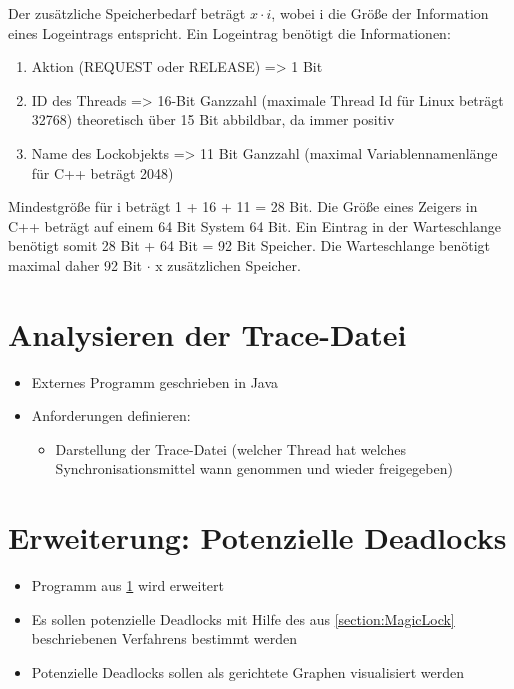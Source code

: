 \begin{itemize}
    Der zusätzliche Speicherbedarf beträgt $x \cdot i$, wobei i die Größe der
    Information eines Logeintrags entspricht. Ein Logeintrag benötigt die
    Informationen:
    \begin{enumerate}
      \item Aktion (REQUEST oder RELEASE) => 1 Bit
      \item ID des Threads => 16-Bit Ganzzahl (maximale Thread Id für Linux
      beträgt 32768) theoretisch über 15 Bit abbildbar, da immer positiv
      \item Name des Lockobjekts => 11 Bit Ganzzahl (maximal Variablennamenlänge
      für C++ beträgt 2048)
    \end{enumerate}
    Mindestgröße für i beträgt 1 + 16 + 11 = 28 Bit. Die Größe eines Zeigers in
    C++ beträgt auf einem 64 Bit System 64 Bit. Ein Eintrag in der Warteschlange
    benötigt somit 28 Bit + 64 Bit = 92 Bit Speicher. Die Warteschlange benötigt
    maximal daher 92 Bit $\cdot$ x zusätzlichen Speicher.
\end{itemize}

\section{Analysieren der Trace-Datei}
\label{section:Analysieren der Trace-Datei}
\begin{itemize}
  \item Externes Programm geschrieben in Java
  \item Anforderungen definieren:
  \begin{itemize}
    \item Darstellung der Trace-Datei (welcher Thread hat welches
    Synchronisationsmittel wann genommen und wieder freigegeben) 
  \end{itemize}
\end{itemize}

\section{Erweiterung: Potenzielle Deadlocks}
\label{section:Erweiterung: Potenzielle Deadlocks}
\begin{itemize}
  \item Programm aus \cref{section:Analysieren der Trace-Datei} wird erweitert
  \item Es sollen potenzielle Deadlocks mit Hilfe des aus \cref{section:MagicLock}
 beschriebenen Verfahrens bestimmt werden
  \item Potenzielle Deadlocks sollen als gerichtete Graphen visualisiert werden
\end{itemize}